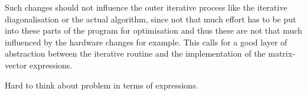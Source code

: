 Such changes should not influence the outer iterative process
like the iterative diagonalisation or the actual \SCF algorithm,
since not that much effort has to be put into these parts
of the program for optimisation
and thus these are not that much influenced by the hardware changes for example.
This calls for a good layer of abstraction between the
iterative routine and the implementation of the matrix-vector \contraction expressions.

Hard to think about problem in terms of expressions.

